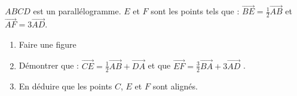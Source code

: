 
$ABCD$ est un parallélogramme.
$E$ et $F$ sont les points tels que : $ \overrightarrow{BE}=\frac{1}{2}\overrightarrow{AB}$ et $\overrightarrow{AF}=3\overrightarrow{AD}$.
\begin{enumerate}
\item  Faire une figure
\item Démontrer que : $ \overrightarrow{CE}=\frac{1}{2}\overrightarrow{AB} + \overrightarrow{DA}$  et que $\overrightarrow{EF}= \frac{3}{2}\overrightarrow{BA} + 3\overrightarrow{AD}$ .
\item En déduire que les points $C$, $E$ et $F$ sont alignés.
\end{enumerate}




